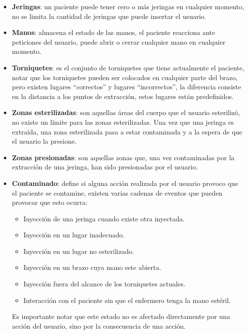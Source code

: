 \begin{itemize}
    \item \textbf{Jeringas}: un paciente puede tener cero o más jeringas en
        cualquier momento, no se limita la cantidad de jeringas que puede
        insertar el usuario.
    \item \textbf{Manos}: almacena el estado de las manos, el paciente reacciona
        ante peticiones del usuario, puede abrir o cerrar cualquier mano en
        cualquier momento.
    \item \textbf{Torniquetes}: es el conjunto de torniquetes que tiene
        actualmente el paciente, notar que los torniquetes pueden ser colocados
        en cualquier parte del brazo, pero existen lugares \enquote{correctos} y
        lugares \enquote{incorrectos}, la diferencia consiste en la distancia a
        los puntos de extracción, estos lugares están predefinidos.
    \item \textbf{Zonas esterilizadas}: son aquellas áreas del cuerpo que el
        usuario esterilizó, no existe un límite para las zonas esterilizadas.
        Una vez que una jeringa es extraída, una zona esterilizada pasa a estar
        contaminada y a la espera de que el usuario la presione.
    \item \textbf{Zonas presionadas}: son aquellas zonas que, una vez
        contaminadas por la extracción de una jeringa, han sido presionadas por
        el usuario.
    \item \textbf{Contaminado}: define si alguna acción realizada por el usuario
        provoco que el paciente se contamine, existen varias cadenas de eventos
        que pueden provocar que esto ocurra:
        \begin{itemize}
            \item Inyección de una jeringa cuando existe otra inyectada.
            \item Inyección en un lugar inadecuado.
            \item Inyección en un lugar no esterilizado.
            \item Inyección en un brazo cuya mano este abierta.
            \item Inyección fuera del alcance de los torniquetes actuales.
            \item Interacción con el paciente sin que el enfermero tenga la mano
                estéril.
        \end{itemize}
        Es importante notar que este estado no es afectado directamente por una
        acción del usuario, sino por la consecuencia de una acción.
\end{itemize}

